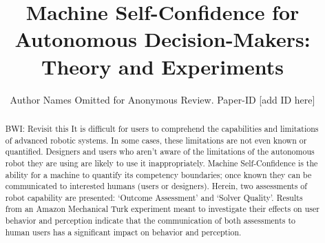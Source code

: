 \documentclass[conference,10pt]{IEEEtran}
\newcommand{\hlb}[1]{{\color{blue} #1}}
\newcommand{\brett}[1]{\hlb{BWI: #1}}
\begin{document}
\title{Machine Self-Confidence for Autonomous Decision-Makers: Theory and Experiments}
\author{Author Names Omitted for Anonymous Review. Paper-ID [add ID here]} 

\maketitle

\begin{abstract}
    \brett{Revisit this}
    It is difficult for users to comprehend the capabilities and limitations of advanced robotic systems. In some cases, these limitations are not even known or quantified. Designers and users who aren't aware of the limitations of the autonomous robot they are using are likely to use it inappropriately. Machine Self-Confidence is the ability for a machine to quantify its competency boundaries; once known they can be communicated to interested humans (users or designers). Herein, two assessments of robot capability are presented: `Outcome Assessment' and `Solver Quality'. Results from an Amazon Mechanical Turk experiment meant to investigate their effects on user behavior and perception indicate that the communication of both assessments to human users has a significant impact on behavior and perception.
\end{abstract}

\IEEEpeerreviewmaketitle












\appendices

\end{document}
